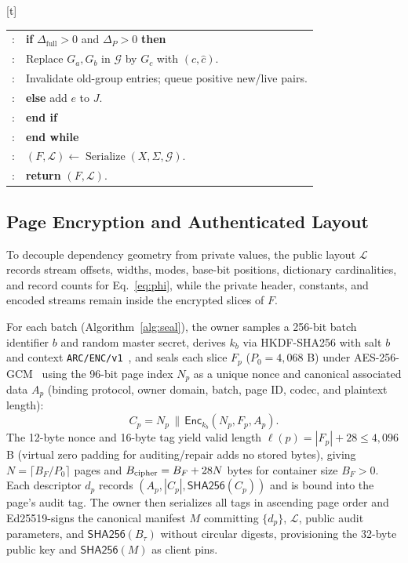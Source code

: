\documentclass[10pt,journal]{IEEEtran}
\makeatletter
\newcounter{algorithm}
\newenvironment{algorithm}[1][t]{\@float{algorithm}[#1]%
  \long\def\@makecaption##1##2{%
    \par\hrule height .8pt\kern2pt
    {\normalfont\normalsize\noindent\textbf{##1:} ##2\par}%
    \kern2pt\hrule height .8pt\kern2pt}%
}{\end@float}
\newcounter{algline}
\newcommand{\al}{\stepcounter{algline}\thealgline:}
\makeatother
\begin{document}
\begin{algorithm}[t]
\begin{tabular}{@{}r@{\enspace} >{\raggedright\arraybackslash}p{}@{}}
\al & \hspace*{1em}\textbf{if} $\Delta_{\mathrm{full}}>0$ and $\Delta_P>0$ \textbf{then}\\
\al & \hspace*{2em}Replace $G_a,G_b$ in $\mathcal G$ by $G_c$ with $(c,\widehat c)$.\\
\al & \hspace*{2em}Invalidate old-group entries; queue positive new/live pairs.\\
\al & \hspace*{1em}\textbf{else} add $e$ to $J$.\\
\al & \hspace*{1em}\textbf{end if}\\
\al & \textbf{end while}\\
\al & $(F,\mathcal L)\gets\operatorname{Serialize}(X,\Sigma,\mathcal G)$.\\
\al & \textbf{return} $(F,\mathcal L)$.\\\bottomrule
\end{tabular}
\end{algorithm}

\subsection{Page Encryption and Authenticated Layout}\label{sec:seal}
To decouple dependency geometry from private values, the public layout $\mathcal L$ records stream offsets, widths, modes, base-bit positions, dictionary cardinalities, and record counts for Eq.~\eqref{eq:phi}, while the private header, constants, and encoded streams remain inside the encrypted slices of $F$.

For each batch (Algorithm~\ref{alg:seal}), the owner samples a 256-bit batch identifier $b$ and random master secret, derives $k_b$ via HKDF-SHA256 with salt $b$ and context \texttt{ARC/ENC/v1}~\cite{RFC5869}, and seals each slice $F_p$ ($P_0=4{,}068$ B) under AES-256-GCM~\cite{RFC5116} using the 96-bit page index $N_p$ as a unique nonce and canonical associated data $A_p$ (binding protocol, owner domain, batch, page ID, codec, and plaintext length):
\begin{equation}\label{eq:cipher}
C_p=N_p\,\|\,\mathsf{Enc}_{k_b}(N_p,F_p,A_p).
\end{equation}
The 12-byte nonce and 16-byte tag yield valid length $\ell(p)=|F_p|+28\leq4{,}096$ B (virtual zero padding for auditing/repair adds no stored bytes), giving $N=\lceil B_F/P_0\rceil$ pages and $B_{\rm cipher}=B_F+28N$ bytes for container size $B_F>0$. Each descriptor $d_p$ records $(A_p,|C_p|,\mathsf{SHA256}(C_p))$ and is bound into the page's audit tag. The owner then serializes all tags in ascending page order and Ed25519-signs the canonical manifest $M$ committing $\{d_p\}$, $\mathcal L$, public audit parameters, and $\mathsf{SHA256}(B_\tau)$ without circular digests, provisioning the 32-byte public key and $\mathsf{SHA256}(M)$ as client pins.
\end{document}
